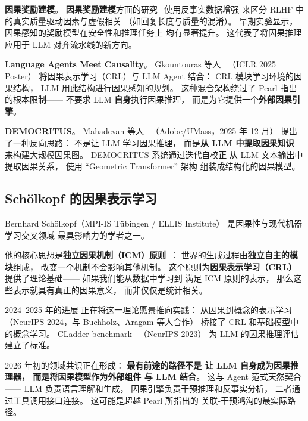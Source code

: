 \textbf{因果奖励建模}。
\textbf{因果奖励建模}方面的研究~\cite{crome2025deepmind}
使用反事实数据增强
来区分 RLHF 中的真实质量驱动因素与虚假相关
（如回复长度与质量的混淆）。
早期实验显示，
因果感知的奖励模型在安全性和推理任务上
均有显著提升。
这代表了将因果推理应用于
LLM 对齐流水线的新方向。

\textbf{Language Agents Meet Causality}。
Gkountouras 等人~\cite{gkountouras2025languageagents}
（ICLR 2025 Poster）
将因果表示学习（CRL）与 LLM Agent 结合：
CRL 模块学习环境的因果结构，
LLM 用此结构进行因果感知的规划。
这种混合架构绕过了 Pearl 指出的根本限制——
不要求 LLM \textbf{自身}执行因果推理，
而是为它提供一个\textbf{外部因果引擎}。

\textbf{DEMOCRITUS}。
Mahadevan 等人~\cite{mahadevan2025democritus}
（Adobe/UMass，2025 年 12 月）
提出了一种反向思路：
不是让 LLM 学习因果推理，
而是\textbf{从 LLM 中提取因果知识}
来构建大规模因果图。
DEMOCRITUS 系统通过迭代自校正
从 LLM 文本输出中提取因果关系，
使用 ``Geometric Transformer'' 架构
组装成结构化的因果模型。

\subsection{Sch\"{o}lkopf 的因果表示学习}

Bernhard Sch\"{o}lkopf（MPI-IS T\"{u}bingen / ELLIS Institute）
是因果性与现代机器学习交叉领域
最具影响力的学者之一。

他的核心思想是\textbf{独立因果机制（ICM）原则}~\cite{scholkopf2021causalrep}：
世界的生成过程由\textbf{独立自主的模块}组成，
改变一个机制不会影响其他机制。
这个原则为\textbf{因果表示学习（CRL）}
提供了理论基础——
如果我们能从数据中学习到
满足 ICM 原则的表示，
那么这些表示就具有真正的因果意义，
而非仅仅是统计相关。

2024--2025 年的进展
正在将这一理论愿景推向实践：
从因果到概念的表示学习~\cite{rajendran2024causalconcept}
（NeurIPS 2024，与 Buchholz、Aragam 等人合作）
桥接了 CRL 和基础模型中的概念学习。
CLadder benchmark~\cite{jin2023cladder}
（NeurIPS 2023）
为 LLM 的因果推理评估建立了标准。

\begin{keybox}[因果推理的未来]
2026 年初的领域共识正在形成：
\textbf{最有前途的路径不是
让 LLM 自身成为因果推理器，
而是将因果模型作为外部组件
与 LLM 结合}。
这与 Agent 范式天然契合——
LLM 负责语言理解和生成，
因果引擎负责干预推理和反事实分析，
二者通过工具调用接口连接。
这可能是超越 Pearl 所指出的
关联-干预鸿沟的最实际路径。
\end{keybox}


